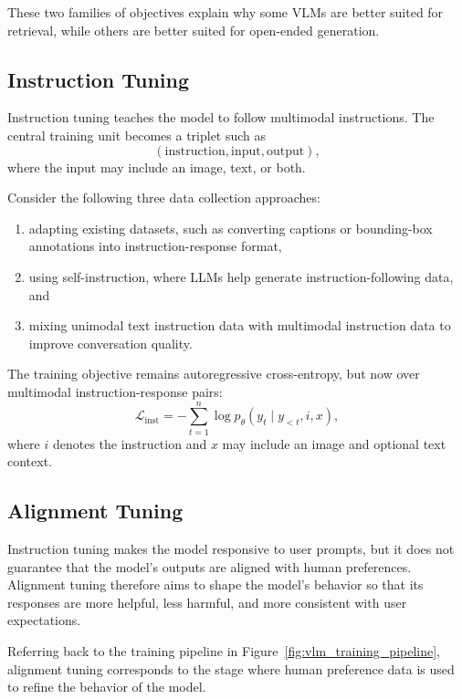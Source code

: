 \documentclass{article}
\begin{document}
These two families of objectives explain why some VLMs are better suited for retrieval, while others are better suited for open-ended generation.

\subsection{Instruction Tuning}

Instruction tuning teaches the model to follow multimodal instructions. The central training unit becomes a triplet such as
\[
(\text{instruction}, \text{input}, \text{output}),
\]
where the input may include an image, text, or both.

Consider the following three data collection approaches:
\begin{enumerate}
    \item adapting existing datasets, such as converting captions or bounding-box annotations into instruction-response format,
    \item using self-instruction, where LLMs help generate instruction-following data, and
    \item mixing unimodal text instruction data with multimodal instruction data to improve conversation quality.
\end{enumerate}

The training objective remains autoregressive cross-entropy, but now over multimodal instruction-response pairs:
\begin{equation}
    \mathcal{L}_{\text{inst}} = -\sum_{t=1}^{n} \log p_\theta(y_t \mid y_{<t}, i, x),
\end{equation}
where $i$ denotes the instruction and $x$ may include an image and optional text context.

\subsection{Alignment Tuning}

Instruction tuning makes the model responsive to user prompts, but it does not guarantee that the model's outputs are aligned with human preferences. Alignment tuning therefore aims to shape the model's behavior so that its responses are more helpful, less harmful, and more consistent with user expectations.

Referring back to the training pipeline in Figure~\ref{fig:vlm_training_pipeline}, alignment tuning corresponds to the stage where human preference data is used to refine the behavior of the model.
\end{document}
